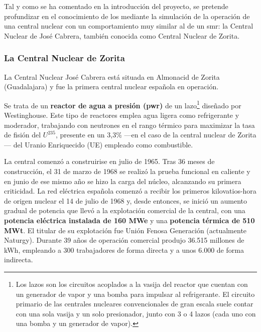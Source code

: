 Tal y como se ha comentado en la introducción del proyecto, se pretende profundizar en el conocimiento de los \emph{} mediante la simulación de la operación de una central nuclear con un comportamiento muy similar al de un \acrshort{smr}: la Central Nuclear de José Cabrera, también conocida como Central Nuclear de Zorita.

\subsubsection{La Central Nuclear de Zorita}

La Central Nuclear José Cabrera está situada en Almonacid de Zorita (Guadalajara) y fue la primera central nuclear española en operación.

Se trata de un \textbf{reactor de agua a presión (\acrshort{pwr})} de un lazo\footnote{Los lazos son los circuitos acoplados a la vasija del reactor que cuentan con un generador de vapor y una bomba para impulsar al refrigerante. El circuito primario de las centrales nucleares convencionales de gran escala suele contar con una sola vasija y un solo presionador, junto con 3 o 4 lazos (cada uno con una bomba y un generador de vapor).} diseñado por Westinghouse. Este tipo de reactores emplea agua ligera como refrigerante y moderador, trabajando con neutrones en el rango térmico para maximizar la tasa de fisión del $U^{235}$, presente en un 3,3\% ---en el caso de la central nuclear de Zorita--- del Uranio Enriquecido (UE) empleado como combustible.

La central comenzó a construirise en julio de 1965. Tras 36 meses de construcción, el 31 de marzo de 1968 se realizó la prueba funcional en caliente y en junio de ese mismo año se hizo la carga del núcleo, alcanzando su primera criticidad. La red eléctrica española comenzó a recibir los primeros kilovatios-hora de origen nuclear el 14 de julio de 1968 y, desde entonces, se inició un aumento gradual de potencia que llevó a la explotación comercial de la central, con una \textbf{potencia eléctrica instalada de 160 MWe} y una \textbf{potencia térmica de 510 MWt}. El titular de su explotación fue Unión Fenosa Generación (actualmente Naturgy). Durante 39 años de operación comercial produjo 36.515 millones de kWh, empleando a 300 trabajadores de forma directa y a unos 6.000 de forma indirecta.

